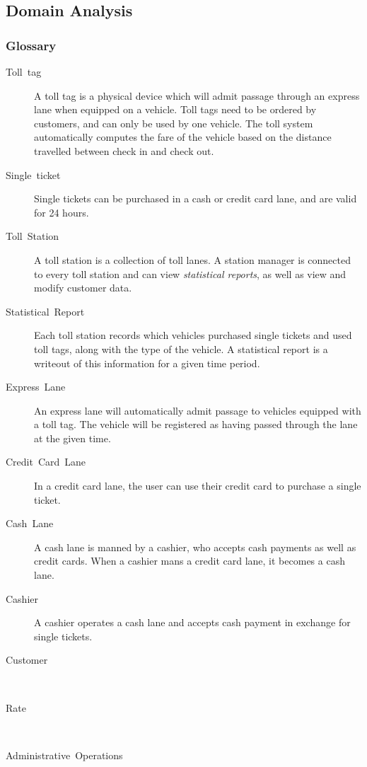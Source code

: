 \subsection {Domain Analysis}

\subsubsection {Glossary}

\begin{description}
\item [{Toll~tag}] A toll tag is a physical device which will admit passage
through an express lane when equipped on a vehicle. Toll tags need
to be ordered by customers, and can only be used by one vehicle. The
toll system automatically computes the fare of the vehicle based on
the distance travelled between check in and check out.
\item [{Single~ticket}] Single tickets can be purchased in a cash or credit
card lane, and are valid for 24 hours.
\item [{Toll~Station}] A toll station is a collection of toll lanes. A
station manager is connected to every toll station and can view \emph{statistical
reports}, as well as view and modify customer data.
\item [{Statistical~Report}] Each toll station records which vehicles
purchased single tickets and used toll tags, along with the type of
the vehicle. A statistical report is a writeout of this information
for a given time period.
\item [{Express~Lane}] An express lane will automatically admit passage
to vehicles equipped with a toll tag. The vehicle will be registered
as having passed through the lane at the given time.
\item [{Credit~Card~Lane}] In a credit card lane, the user can use their
credit card to purchase a single ticket.
\item [{Cash~Lane}] A cash lane is manned by a cashier, who accepts cash
payments as well as credit cards. When a cashier mans a credit card
lane, it becomes a cash lane.
\item [{Cashier}] A cashier operates a cash lane and accepts cash payment
in exchange for single tickets.
\item [{Customer}]~
\item [{Rate}]~
\item [{Administrative~Operations}]~
\end{description}